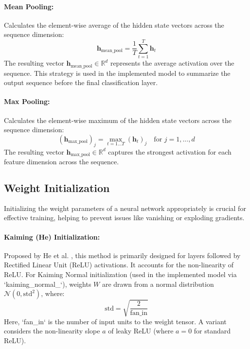 \begin{appendices}
  \paragraph{Mean Pooling:}
  Calculates the element-wise average of the hidden state vectors across the sequence dimension:
  \begin{equation}
    \bm{h}_{\text{mean\_pool}} = \frac{1}{T} \sum_{t=1}^T \bm{h}_t
  \end{equation}
  The resulting vector \( \bm{h}_{\text{mean\_pool}} \in \mathbb{R}^d \) represents the average activation over the sequence. This strategy is used in the implemented model to summarize the output sequence before the final classification layer.

  \paragraph{Max Pooling:}
  Calculates the element-wise maximum of the hidden state vectors across the sequence dimension:
  \begin{equation}
    (\bm{h}_{\text{max\_pool}})_j = \max_{t=1...T} (\bm{h}_t)_j \quad \text{for } j = 1, ..., d
  \end{equation}
  The resulting vector \( \bm{h}_{\text{max\_pool}} \in \mathbb{R}^d \) captures the strongest activation for each feature dimension across the sequence.

  \subsection{Weight Initialization}
  Initializing the weight parameters of a neural network appropriately is crucial for effective training, helping to prevent issues like vanishing or exploding gradients.

  \paragraph{Kaiming (He) Initialization:}
  Proposed by He et al. \autocite{he2015delving}, this method is primarily designed for layers followed by Rectified Linear Unit (ReLU) activations. It accounts for the non-linearity of ReLU. For Kaiming Normal initialization (used in the implemented model via `kaiming\_normal_`), weights \( W \) are drawn from a normal distribution \( \mathcal{N}(0, \text{std}^2) \), where:
  \begin{equation}
    \text{std} = \sqrt{\frac{2}{\text{fan\_in}}}
  \end{equation}
  Here, `fan\_in` is the number of input units to the weight tensor. A variant considers the non-linearity slope \( a \) of leaky ReLU (where \( a=0 \) for standard ReLU).


\end{appendices}
